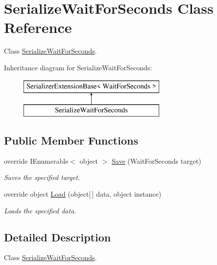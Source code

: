 \hypertarget{class_serialize_wait_for_seconds}{}\section{Serialize\+Wait\+For\+Seconds Class Reference}
\label{class_serialize_wait_for_seconds}


Class \hyperlink{class_serialize_wait_for_seconds}{Serialize\+Wait\+For\+Seconds}.  


Inheritance diagram for Serialize\+Wait\+For\+Seconds\+:\begin{figure}[H]
\begin{center}
\leavevmode
\includegraphics[height=2.000000cm]{class_serialize_wait_for_seconds}
\end{center}
\end{figure}
\subsection*{Public Member Functions}
\begin{DoxyCompactItemize}
\item 
override I\+Enumerable$<$ object $>$ \hyperlink{class_serialize_wait_for_seconds_aa62dde11ef51cf1093957eb61841816e}{Save} (Wait\+For\+Seconds target)
\begin{DoxyCompactList}\small\item\em Saves the specified target. \end{DoxyCompactList}\item 
override object \hyperlink{class_serialize_wait_for_seconds_a458c026ee7885ad2740dde5205b94eb7}{Load} (object\mbox{[}$\,$\mbox{]} data, object instance)
\begin{DoxyCompactList}\small\item\em Loads the specified data. \end{DoxyCompactList}\end{DoxyCompactItemize}


\subsection{Detailed Description}
Class \hyperlink{class_serialize_wait_for_seconds}{Serialize\+Wait\+For\+Seconds}. 



